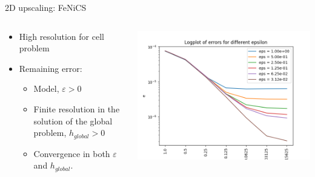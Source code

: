 \documentclass{beamer}
\renewcommand{\epsilon}{\varepsilon}
\begin{document}
\begin{frame}[t]{2D upscaling: FeNiCS}
  \begin{columns}
    \begin{column}[c]{.6\textwidth}
      \begin{itemize}
       \item High resolution for cell problem
       \item Remaining error:
      \begin{itemize}
        \item Model, $\epsilon > 0$
        \item Finite resolution in the solution of the global problem, $ h_{global} > 0$
        \item Convergence in both  $\epsilon$ and $h_{global}$.
       \end{itemize}
      \end{itemize}
    \end{column}
    \begin{column}[c]{.5\textwidth}
      \includegraphics[width=0.9\linewidth]{2d_global_errors.png}      %
    \end{column}
  \end{columns}
\end{frame}
\end{document}
